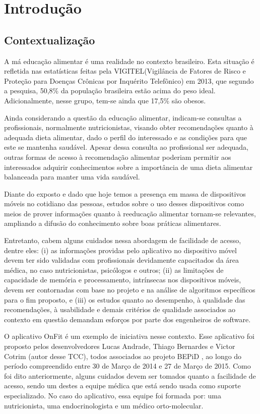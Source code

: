 \chapter[Introdução]{Introdução}
\section{Contextualização}


A má educação alimentar é uma realidade no contexto brasileiro. Esta situação é
refletida nas estatísticas feitas pela VIGITEL(Vigilância de Fatores de Risco e Proteção
para Doenças Crônicas por Inquérito Telefônico) em 2013, que segundo a pesquisa,
50,8\% da população brasileira estão acima do peso ideal. Adicionalmente, nesse grupo,
tem-se ainda que 17,5\% são obesos.

Ainda considerando a questão da educação alimentar, indicam-se consultas a
profissionais, normalmente nutricionistas, visando obter recomendações quanto à
adequada dieta alimentar, dado o perfil do interessado e as condições para que este se
mantenha saudável. Apesar dessa consulta ao profissional ser adequada, outras formas
de acesso à recomendação alimentar poderiam permitir aos interessados adquirir
conhecimentos sobre a importância de uma dieta alimentar balanceada para manter uma
vida saudável.

Diante do exposto e dado que hoje temos a presença em massa de dispositivos
móveis no cotidiano das pessoas, estudos sobre o uso desses dispositivos como meios
de prover informações quanto à reeducação alimentar tornam-se relevantes, ampliando a
difusão do conhecimento sobre boas práticas alimentares.

Entretanto, cabem alguns cuidados nessa abordagem de facilidade de acesso,
dentre eles: (i) as informações providas pelo aplicativo no dispositivo móvel devem ter
sido validadas com profissionais devidamente capacitados da área médica, no caso
nutricionistas, psicólogos e outros; (ii) as limitações de capacidade de memória e
processamento, intrínsecas nos dispositivos móveis, devem ser contornadas com base no
projeto e na análise de algoritmos específicos para o fim proposto, e (iii) os estudos
quanto ao desempenho, à qualidade das recomendações, à usabilidade e demais critérios
de qualidade associados ao contexto em questão demandam esforços por parte dos engenheiros de software.

O aplicativo OnFit \cite{onfit} é um exemplo de iniciativa nesse contexto. Esse
aplicativo foi proposto pelos desenvolvedores Lucas Andrade, Thiago Bernardes e
Victor Cotrim (autor desse TCC), todos associados ao projeto BEPiD \cite{bepid}, ao longo do
período compreendido entre 30 de Março de 2014 e 27 de Março de 2015. Como foi
dito anteriormente, alguns cuidados devem ser tomados quanto a facilidade de acesso,
sendo um destes a equipe médica que está sendo usada como suporte especializado. No caso do aplicativo, essa equipe foi formada por: uma nutricionista, uma endocrinologista e um médico orto-molecular.

